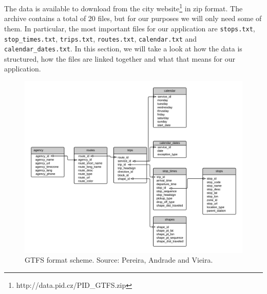 The data is available to download from the city website\footnote{http://data.pid.cz/PID\_GTFS.zip} in zip format. The archive contains a total of 20 files, but for our purposes we will only need some of them. In particular, the most important files for our application are \texttt{stops.txt}, \texttt{stop\_times.txt}, \texttt{trips.txt}, \texttt{routes.txt}, \texttt{calendar.txt} and \texttt{calendar\_dates.txt}. In this section, we will take a look at how the data is structured, how the files are linked together and what that means for our application.

\begin{figure}[h!]
    \centering
    \includegraphics[width=\textwidth]{img/gtfs_scheme.png}
    \caption[GTFS Format Scheme]{GTFS format scheme. Source: Pereira, Andrade and Vieira\cite{pereira2023gtfs}.}
    \label{fig:gtfs_scheme}
\end{figure}

